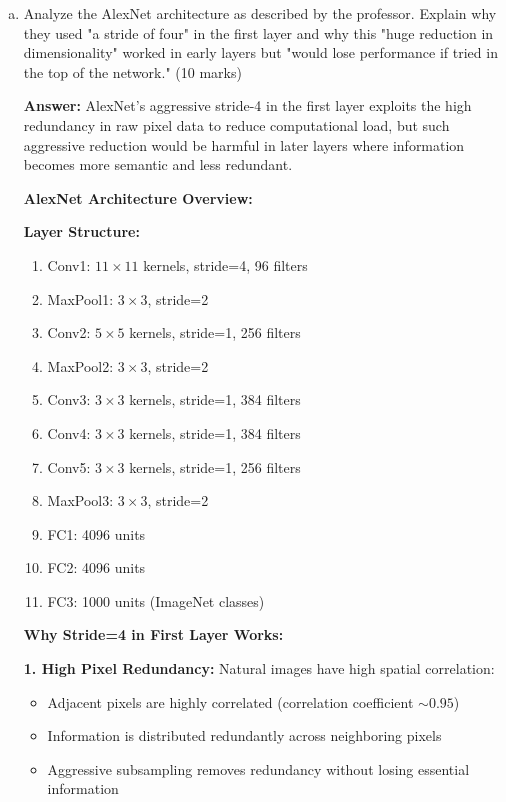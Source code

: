 \documentclass[12pt]{article}
\newcommand{\answer}[1]{{\color{answercolor}\textbf{Answer:} #1}}
\newcommand{\explanation}[1]{{\color{explanationcolor}#1}}
\begin{document}
\begin{enumerate}[(a)]
    \item Analyze the AlexNet architecture as described by the professor. Explain why they used "a stride of four" in the first layer and why this "huge reduction in dimensionality" worked in early layers but "would lose performance if tried in the top of the network." \hfill (10 marks)
    
    \answer{AlexNet's aggressive stride-4 in the first layer exploits the high redundancy in raw pixel data to reduce computational load, but such aggressive reduction would be harmful in later layers where information becomes more semantic and less redundant.}
    
    \explanation{
    \textbf{AlexNet Architecture Overview:}
    
    \textbf{Layer Structure:}
    \begin{enumerate}
        \item Conv1: $11 \times 11$ kernels, stride=4, 96 filters
        \item MaxPool1: $3 \times 3$, stride=2  
        \item Conv2: $5 \times 5$ kernels, stride=1, 256 filters
        \item MaxPool2: $3 \times 3$, stride=2
        \item Conv3: $3 \times 3$ kernels, stride=1, 384 filters
        \item Conv4: $3 \times 3$ kernels, stride=1, 384 filters
        \item Conv5: $3 \times 3$ kernels, stride=1, 256 filters
        \item MaxPool3: $3 \times 3$, stride=2
        \item FC1: 4096 units
        \item FC2: 4096 units  
        \item FC3: 1000 units (ImageNet classes)
    \end{enumerate}
    
    \textbf{Why Stride=4 in First Layer Works:}
    
    \textbf{1. High Pixel Redundancy:}
    Natural images have high spatial correlation:
    \begin{itemize}
        \item Adjacent pixels are highly correlated (correlation coefficient $\sim 0.95$)
        \item Information is distributed redundantly across neighboring pixels
        \item Aggressive subsampling removes redundancy without losing essential information
    \end{itemize}
    
}
\end{enumerate}
\end{document}
